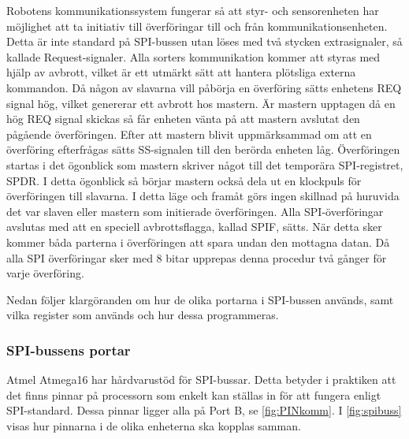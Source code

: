 Robotens kommunikationssystem fungerar så att styr- och sensorenheten har 
möjlighet att ta initiativ till överföringar till och från 
kommunikationsenheten. Detta är inte standard på SPI-bussen utan löses med två 
stycken extrasignaler, så kallade Request-signaler. Alla sorters kommunikation 
kommer att styras med hjälp av avbrott, vilket är ett utmärkt sätt att hantera 
plötsliga externa kommandon. Då någon av slavarna vill påbörja en överföring 
sätts enhetens REQ signal hög, vilket genererar ett avbrott hos mastern. Är 
mastern upptagen då en hög REQ signal skickas så får enheten vänta på att 
mastern avslutat den pågående överföringen. Efter att mastern blivit 
uppmärksammad om att en överföring efterfrågas sätts SS-signalen till den 
berörda enheten låg. Överföringen startas i det ögonblick som mastern skriver 
något till det temporära SPI-registret, SPDR. I detta ögonblick så börjar 
mastern också dela ut en klockpuls för överföringen till slavarna. I detta 
läge och framåt görs ingen skillnad på huruvida det var slaven eller mastern 
som initierade överföringen. Alla SPI-överföringar avslutas med att en speciell
avbrottsflagga, kallad SPIF, sätts. När detta sker kommer båda parterna i 
överföringen att spara undan den mottagna datan. Då alla SPI överföringar sker 
med 8 bitar upprepas denna procedur två gånger för varje överföring.

Nedan följer klargöranden om hur de olika portarna i SPI-bussen används, samt 
vilka register som används och hur dessa programmeras. 

\subsubsection{SPI-bussens portar}

Atmel Atmega16 har hårdvarustöd för SPI-bussar. Detta betyder i praktiken att 
det finns pinnar på processorn som enkelt kan ställas in för att fungera 
enligt SPI-standard. Dessa pinnar ligger alla på Port B, se \ref{fig:PINkomm}.
I \ref{fig:spibuss} visas hur pinnarna i de olika enheterna ska kopplas samman.

